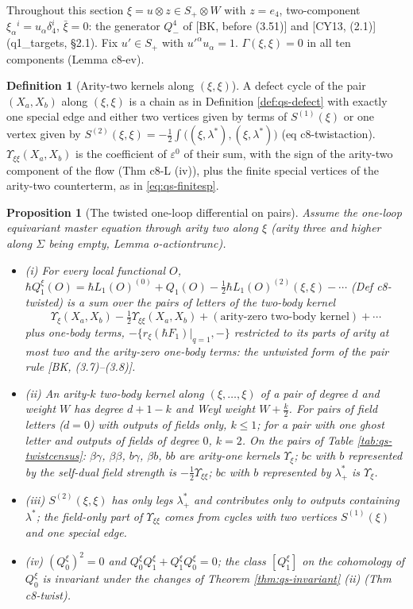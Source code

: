 \documentclass[11pt]{article}
\numberwithin{equation}{section}
\theoremstyle{plain}
\newtheorem{proposition}[theorem]{Proposition}
\theoremstyle{definition}
\newtheorem{definition}[theorem]{Definition}
\begin{document}
Throughout this section $\xi=u\otimes z\in S_+\otimes W$ with $z=e_4$, two-component $\xi_\alpha{}^i=u_\alpha\delta^i_4$, $\bar\xi=0$: the generator $Q^4_-$ of [BK, before (3.51)] and [CY13, (2.1)] (q1\_targets, §2.1). Fix $u'\in S_+$ with $u'^\alpha u_\alpha=1$. $\Gamma(\xi,\xi)=0$ in all ten components (Lemma c8-ev).

\begin{definition}[Arity-two kernels along $(\xi,\xi)$]
\label{def:qs-arity2}
A defect cycle of the pair $(X_a,X_b)$ along $(\xi,\xi)$ is a chain as in Definition \ref{def:qs-defect} with exactly one special edge and either two vertices given by terms of $S^{(1)}(\xi)$ or one vertex given by $S^{(2)}(\xi,\xi)=-\tfrac12\int\big((\xi,\lambda^*),(\xi,\lambda^*)\big)$ (eq c8-twistaction). $\Upsilon_{\xi\xi}(X_a,X_b)$ is the coefficient of $\varepsilon^0$ of their sum, with the sign of the arity-two component of the flow (Thm c8-L (iv)), plus the finite special vertices of the arity-two counterterm, as in \eqref{eq:qs-finitesp}.
\end{definition}

\begin{proposition}[The twisted one-loop differential on pairs]
\label{prop:qs-twist}
Assume the one-loop equivariant master equation through arity two along $\xi$ (arity three and higher along $\Sigma$ being empty, Lemma o-actiontrunc).
\begin{itemize}
\item (i) For every local functional $O$, $\hbar Q^\xi_1(O)=\hbar L_1(O)^{(0)}+Q_1(O)-\tfrac12\hbar L_1(O)^{(2)}(\xi,\xi)-\cdots$ (Def c8-twisted) is a sum over the pairs of letters of the two-body kernel
\[
\Upsilon_\xi(X_a,X_b)-\tfrac12\Upsilon_{\xi\xi}(X_a,X_b)+(\text{arity-zero two-body kernel})+\cdots
\]
plus one-body terms, $-\{r_\xi(\hbar F_1)|_{q=1},-\}$ restricted to its parts of arity at most two and the arity-zero one-body terms: the untwisted form of the pair rule [BK, (3.7)--(3.8)].
\item (ii) An arity-$k$ two-body kernel along $(\xi,\dots,\xi)$ of a pair of degree $d$ and weight $W$ has degree $d+1-k$ and Weyl weight $W+\tfrac k2$. For pairs of field letters ($d=0$) with outputs of fields only, $k\le1$; for a pair with one ghost letter and outputs of fields of degree $0$, $k=2$. On the pairs of Table \ref{tab:qs-twistcensus}: $\beta\gamma$, $\beta\beta$, $b\gamma$, $\beta b$, $bb$ are arity-one kernels $\Upsilon_\xi$; $bc$ with $b$ represented by the self-dual field strength is $-\tfrac12\Upsilon_{\xi\xi}$; $bc$ with $b$ represented by $\lambda^*_+$ is $\Upsilon_\xi$.
\item (iii) $S^{(2)}(\xi,\xi)$ has only legs $\lambda^*_+$ and contributes only to outputs containing $\lambda^*$; the field-only part of $\Upsilon_{\xi\xi}$ comes from cycles with two vertices $S^{(1)}(\xi)$ and one special edge.
\item (iv) $(Q^\xi_0)^2=0$ and $Q^\xi_0Q^\xi_1+Q^\xi_1Q^\xi_0=0$; the class $[Q^\xi_1]$ on the cohomology of $Q^\xi_0$ is invariant under the changes of Theorem \ref{thm:qs-invariant} (ii) (Thm c8-twist).
\end{itemize}
\end{proposition}
\end{document}
